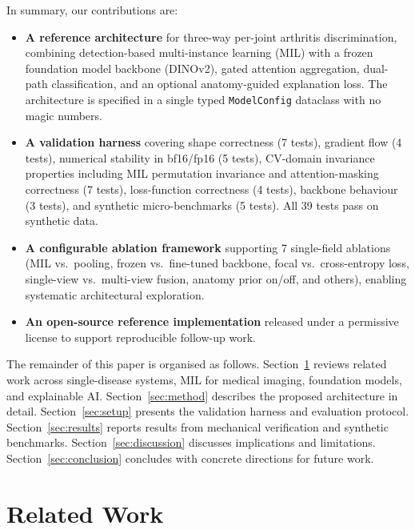 \documentclass{article}
\begin{document}
In summary, our contributions are:
\begin{itemize}
  \item \textbf{A reference architecture} for three-way per-joint arthritis discrimination, combining detection-based multi-instance learning (MIL) with a frozen foundation model backbone (DINOv2), gated attention aggregation, dual-path classification, and an optional anatomy-guided explanation loss. The architecture is specified in a single typed \texttt{ModelConfig} dataclass with no magic numbers.
  \item \textbf{A validation harness} covering shape correctness (7 tests), gradient flow (4 tests), numerical stability in bf16/fp16 (5 tests), CV-domain invariance properties including MIL permutation invariance and attention-masking correctness (7 tests), loss-function correctness (4 tests), backbone behaviour (3 tests), and synthetic micro-benchmarks (5 tests). All 39 tests pass on synthetic data.
  \item \textbf{A configurable ablation framework} supporting 7 single-field ablations (MIL vs.\ pooling, frozen vs.\ fine-tuned backbone, focal vs.\ cross-entropy loss, single-view vs.\ multi-view fusion, anatomy prior on/off, and others), enabling systematic architectural exploration.
  \item \textbf{An open-source reference implementation} released under a permissive license to support reproducible follow-up work.
\end{itemize}

The remainder of this paper is organised as follows. Section~\ref{sec:related} reviews related work across single-disease systems, MIL for medical imaging, foundation models, and explainable AI. Section~\ref{sec:method} describes the proposed architecture in detail. Section~\ref{sec:setup} presents the validation harness and evaluation protocol. Section~\ref{sec:results} reports results from mechanical verification and synthetic benchmarks. Section~\ref{sec:discussion} discusses implications and limitations. Section~\ref{sec:conclusion} concludes with concrete directions for future work.

\section{Related Work}
\label{sec:related}
\end{document}

